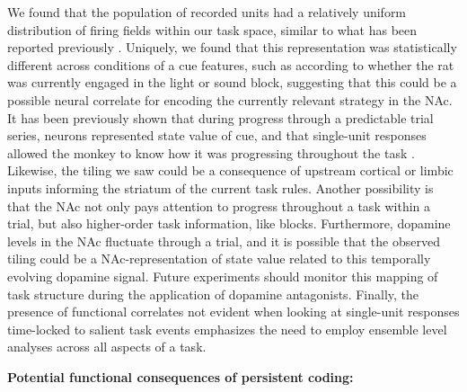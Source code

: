 \documentclass[11pt]{article}
\let\cite=\citep
\begin{document}
{We found that the population of recorded units had a relatively
uniform distribution of firing fields within our task space, similar
to what has been reported previously
\cite{Berke2009,Lansink2012,Shidara1998}. Uniquely, we found that this
representation was statistically different across conditions of a cue
features, such as according to whether the rat was currently engaged
in the light or sound block, suggesting that this could be a possible
neural correlate for encoding the currently relevant strategy in the
NAc. It has been previously shown that during progress through a
predictable trial series, neurons represented state value of cue, and
that single-unit responses allowed the monkey to know how it was
progressing throughout the task \cite{Shidara1998}. Likewise, the
tiling we saw could be a consequence of upstream cortical or limbic
inputs informing the striatum of the current task rules. Another
possibility is that the NAc not only pays attention to progress
throughout a task within a trial, but also higher-order task
information, like blocks. Furthermore, dopamine levels in the NAc
fluctuate through a trial, and it is possible that the observed tiling
could be a NAc-representation of state value related to this
temporally evolving dopamine signal. Future experiments should monitor
this mapping of task structure during the application of dopamine
antagonists. Finally, the presence of functional correlates not
evident when looking at single-unit responses time-locked to salient
task events emphasizes the need to employ ensemble level analyses
across all aspects of a task.

{\bf Potential functional consequences of persistent coding:}

}
\end{document}
